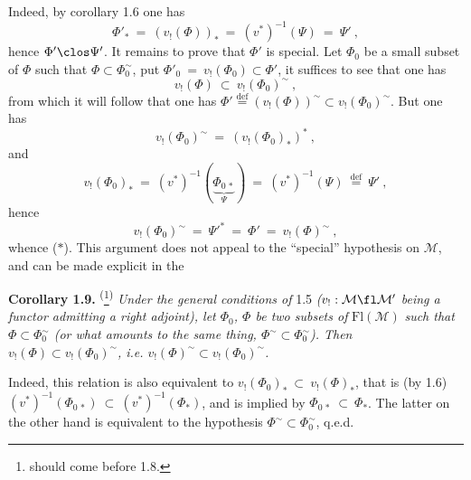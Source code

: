 Indeed, by corollary 1.6 one has
\[
\Phi'_{*} \ =\ (v_{!}(\Phi))_{*} \ =\ (v^{*})^{-1}(\Psi) \ =\ \Psi'\ ,
\]
hence $\Phi' \clos \Psi'$. It remains to prove that $\Phi'$ is special. Let $\Phi_0$ be a small subset of $\Phi$ such that $\Phi \subset \Phi_0^{\sim}$, put $\Phi'_0 \ =\ v_{!}(\Phi_0) \subset \Phi'$,  it suffices to see that one has
\[
v_{!}(\Phi) \ \subset\ v_{!}(\Phi_0)^{\sim}\ , \tag*{($*$)}
\]
from which it will follow that one has $\Phi' \overset{\text{def}}{=} (v_{!}(\Phi))^{\sim} \subset v_{!}(\Phi_0)^{\sim}$. But one has
\[
v_{!}(\Phi_0)^{\sim} \ =\ (v_{!}(\Phi_0)_{*})^{*}\ ,
\]
and
\[
v_{!}(\Phi_0)_{*} \ =\ (v^{*})^{-1}(\underbrace{\Phi_{0\,*}}_{\Psi}) \ =\ (v^{*})^{-1}(\Psi) \ \overset{\text{def}}{=}\ \Psi'\ ,
\]
hence
\[
v_{!}(\Phi_0)^{\sim} \ =\ \Psi'^{*} \ =\ \Phi' \ =\ v_{!}(\Phi)^{\sim}\ ,
\]
whence ($*$). This argument does not appeal to the ``special'' hypothesis on $\mathcal{M}$, and can be made explicit in the

\textbf{Corollary 1.9.} \textsuperscript{(}\footnote[4]{should come before 1.8.}\textsuperscript{)} \textit{Under the general conditions of} 1.5 \textit{($v_{!} : \mathcal{M} \fl \mathcal{M}'$ being a functor admitting a right adjoint), let $\Phi_0$, $\Phi$ be two subsets of} $\mathrm{Fl}(\mathcal{M})$ \textit{such that $\Phi \subset \Phi_0^{\sim}$ (or what amounts to the same thing, $\Phi^{\sim} \subset \Phi_0^{\sim}$). Then $v_{!}(\Phi) \subset v_{!}(\Phi_0)^{\sim}$, i.e. $v_{!}(\Phi)^{\sim} \subset v_{!}(\Phi_0)^{\sim}$.}

Indeed, this relation is also equivalent to $v_{!}(\Phi_0)_{*} \ \subset\ v_{!}(\Phi)_{*}$, that is (by 1.6) $(v^{*})^{-1}(\Phi_{0\,*}) \ \subset\ (v^{*})^{-1}(\Phi_{*})$, and is implied by $\Phi_{0\,*} \ \subset\ \Phi_{*}$. The latter on the other hand is equivalent to the hypothesis $\Phi^{\sim} \subset \Phi_0^{\sim}$, q.e.d.


